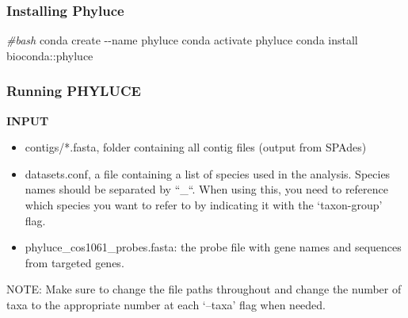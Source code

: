 \documentclass[
  12pt,
]{article}
\newenvironment{Shaded}{\begin{snugshade}}{\end{snugshade}}
\newcommand{\AttributeTok}[1]{\textcolor[rgb]{0.13,0.29,0.53}{#1}}
\newcommand{\CommentTok}[1]{\textcolor[rgb]{0.56,0.35,0.01}{\textit{#1}}}
\newcommand{\ExtensionTok}[1]{#1}
\newcommand{\NormalTok}[1]{#1}
\providecommand{\tightlist}{%
  \setlength{\itemsep}{0pt}\setlength{\parskip}{0pt}}
\begin{document}
\hypertarget{installing-phyluce}{%
\subsubsection{Installing Phyluce}\label{installing-phyluce}}

\begin{Shaded}
\begin{Highlighting}[]
\CommentTok{\#bash}
\ExtensionTok{conda}\NormalTok{ create }\AttributeTok{{-}{-}name}\NormalTok{ phyluce}
\ExtensionTok{conda}\NormalTok{ activate phyluce}
\ExtensionTok{conda}\NormalTok{ install bioconda::phyluce}
\end{Highlighting}
\end{Shaded}

\hypertarget{running-phyluce}{%
\subsubsection{Running PHYLUCE}\label{running-phyluce}}

\textbf{INPUT}

\begin{itemize}
\tightlist
\item
  contigs/*.fasta, folder containing all contig files (output from SPAdes)
\item
  datasets.conf, a file containing a list of species used in the analysis. Species names should be separated by ``\_``. When using this, you need to reference which species you want to refer to by indicating it with the `taxon-group' flag.
\item
  phyluce\_cos1061\_probes.fasta: the probe file with gene names and sequences from targeted genes.
\end{itemize}

NOTE: Make sure to change the file paths throughout and change the number of taxa to the appropriate number at each `--taxa' flag when needed.
\end{document}
